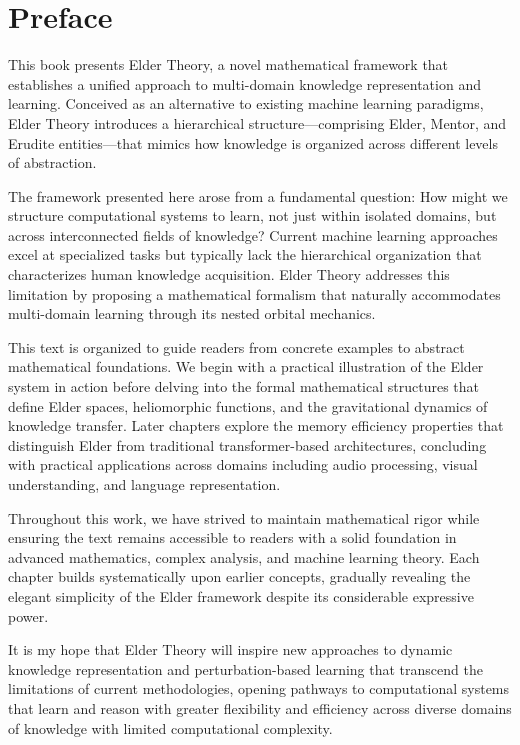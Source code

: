 \documentclass[11pt,twoside]{book}
\begin{document}
\chapter*{Preface}

This book presents Elder Theory, a novel mathematical framework that establishes a unified approach to multi-domain knowledge representation and learning. Conceived as an alternative to existing machine learning paradigms, Elder Theory introduces a hierarchical structure—comprising Elder, Mentor, and Erudite entities—that mimics how knowledge is organized across different levels of abstraction.

The framework presented here arose from a fundamental question: How might we structure computational systems to learn, not just within isolated domains, but across interconnected fields of knowledge? Current machine learning approaches excel at specialized tasks but typically lack the hierarchical organization that characterizes human knowledge acquisition. Elder Theory addresses this limitation by proposing a mathematical formalism that naturally accommodates multi-domain learning through its nested orbital mechanics.

This text is organized to guide readers from concrete examples to abstract mathematical foundations. We begin with a practical illustration of the Elder system in action before delving into the formal mathematical structures that define Elder spaces, heliomorphic functions, and the gravitational dynamics of knowledge transfer. Later chapters explore the memory efficiency properties that distinguish Elder from traditional transformer-based architectures, concluding with practical applications across domains including audio processing, visual understanding, and language representation.

Throughout this work, we have strived to maintain mathematical rigor while ensuring the text remains accessible to readers with a solid foundation in advanced mathematics, complex analysis, and machine learning theory. Each chapter builds systematically upon earlier concepts, gradually revealing the elegant simplicity of the Elder framework despite its considerable expressive power.

It is my hope that Elder Theory will inspire new approaches to dynamic knowledge representation and perturbation-based learning that transcend the limitations of current methodologies, opening pathways to computational systems that learn and reason with greater flexibility and efficiency across diverse domains of knowledge with limited computational complexity.
\end{document}
